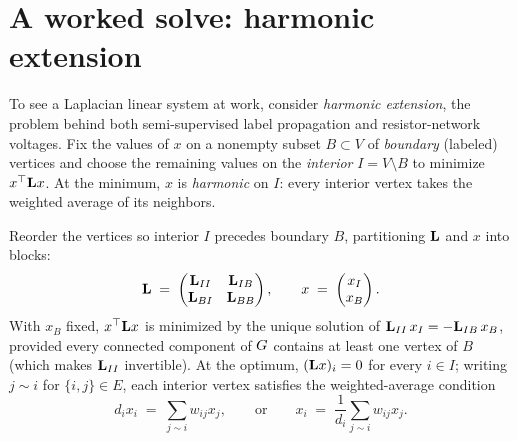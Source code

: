 \section{A worked solve: harmonic extension}\label{ch31:sec-harmonic}

To see a Laplacian linear system at work, consider \emph{harmonic extension}, the problem behind both semi-supervised label propagation and resistor-network voltages. Fix the values of $x$ on a nonempty subset $B\subset V$ of \emph{boundary} (labeled) vertices and choose the remaining values on the \emph{interior} $I = V\setminus B$ to minimize $x^\top\mathbf{L} x$. At the minimum, $x$ is \emph{harmonic} on $I$: every interior vertex takes the weighted average of its neighbors.

\begin{theorem}\label{ch31:thm-harmonic}
Reorder the vertices so interior $I$ precedes boundary $B$, partitioning $\mathbf{L}$ and $x$ into blocks:
\[
  \mathbf{L} \;=\; \begin{pmatrix} \mathbf{L}_{II} & \mathbf{L}_{IB}\\ \mathbf{L}_{BI} & \mathbf{L}_{BB}\end{pmatrix},
  \qquad
  x \;=\; \begin{pmatrix} x_I \\ x_B \end{pmatrix}.
\]
With $x_B$ fixed, $x^\top\mathbf{L} x$ is minimized by the unique solution of $\mathbf{L}_{II}\,x_I = -\mathbf{L}_{IB}\,x_B$, provided every connected component of $G$ contains at least one vertex of $B$ (which makes $\mathbf{L}_{II}$ invertible). At the optimum, $(\mathbf{L} x)_i = 0$ for every $i\in I$; writing $j\sim i$ for $\{i,j\}\in E$, each interior vertex satisfies the weighted-average condition
\[
  d_i x_i \;=\; \sum_{j\sim i} w_{ij} x_j, \qquad \text{or} \qquad x_i \;=\; \frac{1}{d_i}\sum_{j\sim i} w_{ij} x_j .
\]
\end{theorem}

